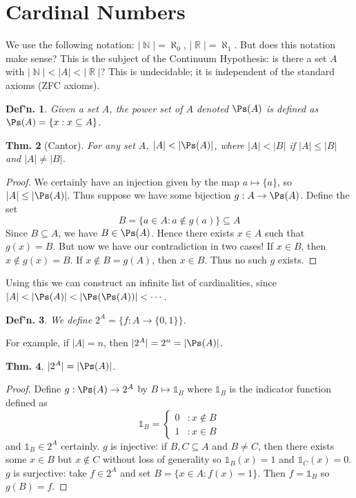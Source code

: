 \documentclass[12pt, a4paper]{book}
\DeclareMathOperator{\N}{\mathbb{N}}
\DeclareMathOperator{\R}{\mathbb{R}}
\newtheorem{theorem}{Thm.}[section]
\newtheorem{definition}[theorem]{Def'n.}
\theoremstyle{nonumberplain}
\newtheorem{proof}{Proof}
\begin{document}
\section{Cardinal Numbers}
We use the following notation: $|\N|=\aleph_0$, $|\R|=\aleph_1$. But does this notation make sense? This is the subject of
the Continuum Hypothesis: is there a set $A$ with $|\N|<|A|<|\R|$? This is undecidable; it is independent of the standard
axioms (ZFC axioms).
\begin{definition}
    Given a set $A$, the power set of $A$ denoted $\Ps(A)$ is defined as $\Ps(A)=\{x:x\subseteq A\}$.
\end{definition}
\begin{theorem}[Cantor]
    For any set $A$, $|A|<|\Ps(A)|$, where $|A|<|B|$ if $|A|\leq|B|$ and $|A|\neq|B|$.
\end{theorem}
\begin{proof}
    We certainly have an injection given by the map $a\mapsto\{a\}$, so $|A|\leq|\Ps(A)|$. Thus suppose we have
    some bijection $g:A\to\Ps(A)$. Define the set
    \[B=\{a\in A:a\notin g(a)\}\subseteq A\]
    Since $B\subseteq A$, we have $B\in\Ps(A)$. Hence there exists $x\in A$ such that $g(x)=B$. But now we have our contradiction
    in two cases! If $x\in B$, then $x\notin g(x)=B$. If $x\notin B=g(A)$, then $x\in B$. Thus no such $g$ exists.
\end{proof}
Using this we can construct an infinite list of cardinalities, since $|A|<|\Ps(A)|<|\Ps(\Ps(A))|<\cdots$.
\begin{definition}
    We define $2^A=\{f:A\to\{0,1\}\}$.
\end{definition}
For example, if $|A|=n$, then $|2^A|=2^n=|\Ps(A)|$.
\begin{theorem}
    $|2^A|=|\Ps(A)|$.
\end{theorem}
\begin{proof}
    Define $g:\Ps(A)\to 2^A$ by $B\mapsto \mathds{1}_B$ where $\mathds{1}_B$ is the indicator function defined as
    \[\mathds{1}_B=
    \begin{cases}
        0 &:x\notin B\\
        1 &:x\in B
    \end{cases}
    \]
    and $\mathds{1}_B\in 2^A$ certainly. $g$ is injective: if $B,C\subseteq A$ and $B\neq C$, then there exists
    some $x\in B$ but $x\notin C$ without loss of generality so $\mathds{1}_B(x)=1$ and $\mathds{1}_C(x)=0$. $g$
    is surjective: take $f\in 2^A$ and set $B=\{x\in A:f(x)=1\}$. Then $f=\mathds{1}_B$ so $g(B)=f$.
\end{proof}
\end{document}
